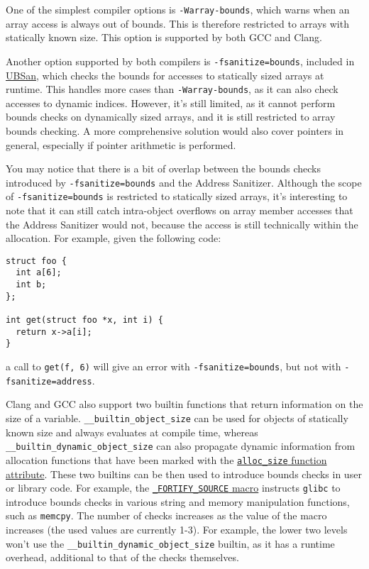 \documentclass[
  a4paper,
]{report}
\begin{document}
One of the simplest compiler options is \texttt{-Warray-bounds}, which
warns when an array access is always out of bounds. This is therefore
restricted to arrays with statically known size. This option is
supported by both GCC and Clang.

Another option supported by both compilers is
\texttt{-fsanitize=bounds}, included in \hyperref[sanitizers]{UBSan},
which checks the bounds for accesses to statically sized arrays at
runtime. This handles more cases than \texttt{-Warray-bounds}, as it can
also check accesses to dynamic indices. However, it's still limited, as
it cannot perform bounds checks on dynamically sized arrays, and it is
still restricted to array bounds checking. A more comprehensive solution
would also cover pointers in general, especially if pointer arithmetic
is performed.

You may notice that there is a bit of overlap between the bounds checks
introduced by \texttt{-fsanitize=bounds} and the Address Sanitizer.
Although the scope of \texttt{-fsanitize=bounds} is restricted to
statically sized arrays, it's interesting to note that it can still
catch \label{__index_entry_88}{intra-object
overflows} on array member accesses that
the Address Sanitizer would not, because the access is still technically
within the allocation. For example, given the following code:

\begin{verbatim}
struct foo {
  int a[6];
  int b;
};

int get(struct foo *x, int i) {
  return x->a[i];
}
\end{verbatim}

a call to \texttt{get(f,\ 6)} will give an error with
\texttt{-fsanitize=bounds}, but not with \texttt{-fsanitize=address}.

Clang and GCC also support two builtin functions that return information
on the size of a variable. \texttt{\_\_builtin\_object\_size} can be
used for objects of statically known size and always evaluates at
compile time, whereas \texttt{\_\_builtin\_dynamic\_object\_size} can
also propagate dynamic information from allocation functions that have
been marked with the
\href{https://gcc.gnu.org/onlinedocs/gcc-4.7.2/gcc/Function-Attributes.html}{\texttt{alloc\_size}
function attribute}. These two builtins can be then used to introduce
bounds checks in user or library code. For example, the
\href{https://man7.org/linux/man-pages/man7/feature_test_macros.7.html}{\texttt{\_FORTIFY\_SOURCE}
macro} instructs \texttt{glibc} to introduce bounds checks in various
string and memory manipulation functions, such as \texttt{memcpy}. The
number of checks increases as the value of the macro increases (the used
values are currently 1-3). For example, the lower two levels won't use
the \texttt{\_\_builtin\_dynamic\_object\_size} builtin, as it has a
runtime overhead, additional to that of the checks themselves.
\end{document}
